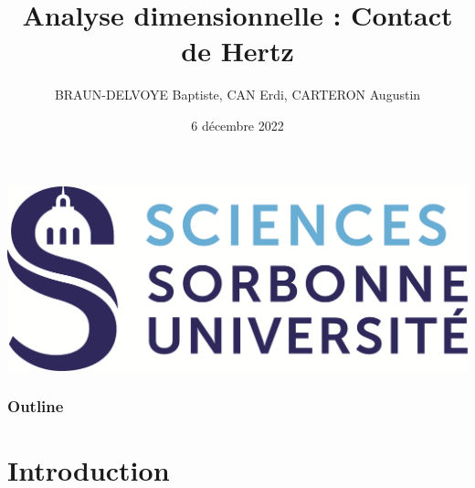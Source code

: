 \documentclass[aspectratio=169,xcolor=dvipsnames]{beamer}
\title[Analyse dimensionnelle : Contact de Hertz]{Analyse dimensionnelle : Contact de Hertz}
\author[Nous] {BRAUN-DELVOYE  Baptiste, CAN Erdi, CARTERON Augustin}
\date{6 décembre 2022} %
\institute{Sorbonne Université}
\begin{document}
{
\begin{frame}
    \titlepage
    \centering
    \includegraphics[scale=.2]{SORBONNE_FAC_SCIENCES_DEF_CMJN.png}
\end{frame}
}

\begin{frame}
    \frametitle{Outline}
    \tableofcontents
\end{frame}

\section{Introduction}
\end{document}
